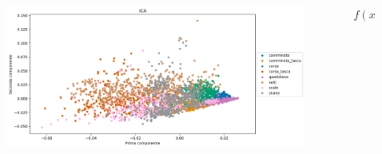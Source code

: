 \documentclass{beamer}
\begin{document}
\begin{frame}

\begin{columns}[T] %
\begin{column}{.48\textwidth}
\begin{figure}[H]
\includegraphics[width=\textwidth]{../figure/ICA.png}
\end{figure}
\end{column}%
\hfill%
\begin{column}{.48\textwidth}
$f(x)=x^2$
\end{column}%
\end{columns}
\end{frame}
%
%

\end{document}
